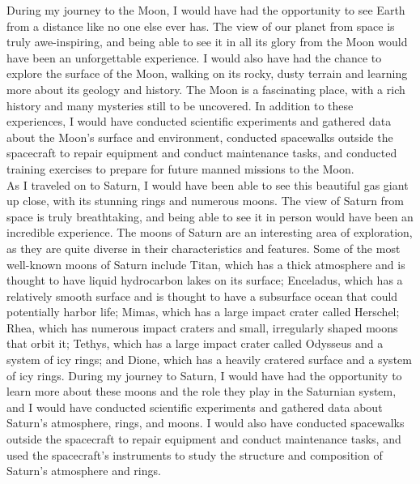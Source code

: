 

During my journey to the Moon, I would have had the opportunity to see Earth from a distance like no one else ever has. The view of our planet from space is truly awe-inspiring, and being able to see it in all its glory from the Moon would have been an unforgettable experience. I would also have had the chance to explore the surface of the Moon, walking on its rocky, dusty terrain and learning more about its geology and history. The Moon is a fascinating place, with a rich history and many mysteries still to be uncovered. In addition to these experiences, I would have conducted scientific experiments and gathered data about the Moon's surface and environment, conducted spacewalks outside the spacecraft to repair equipment and conduct maintenance tasks, and conducted training exercises to prepare for future manned missions to the Moon. \\


As I traveled on to Saturn, I would have been able to see this beautiful gas giant up close, with its stunning rings and numerous moons. The view of Saturn from space is truly breathtaking, and being able to see it in person would have been an incredible experience. The moons of Saturn are an interesting area of exploration, as they are quite diverse in their characteristics and features. Some of the most well-known moons of Saturn include Titan, which has a thick atmosphere and is thought to have liquid hydrocarbon lakes on its surface; Enceladus, which has a relatively smooth surface and is thought to have a subsurface ocean that could potentially harbor life; Mimas, which has a large impact crater called Herschel; Rhea, which has numerous impact craters and small, irregularly shaped moons that orbit it; Tethys, which has a large impact crater called Odysseus and a system of icy rings; and Dione, which has a heavily cratered surface and a system of icy rings. During my journey to Saturn, I would have had the opportunity to learn more about these moons and the role they play in the Saturnian system, and I would have conducted scientific experiments and gathered data about Saturn's atmosphere, rings, and moons. I would also have conducted spacewalks outside the spacecraft to repair equipment and conduct maintenance tasks, and used the spacecraft's instruments to study the structure and composition of Saturn's atmosphere and rings. \\


